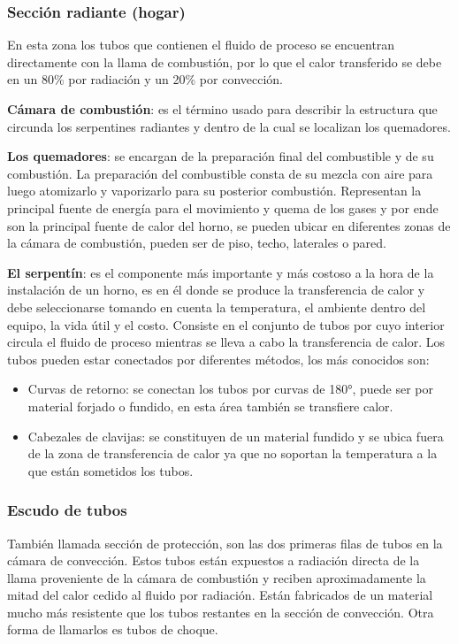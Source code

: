 \subsubsection{Sección radiante (hogar)}
\par En esta zona los tubos que contienen el fluido de proceso se encuentran directamente con la llama de combustión, por lo que el calor transferido se debe en un 80\% por radiación y un 20\% por convección. 
\par \textbf{Cámara de combustión}: es el término usado para describir la estructura que circunda los serpentines radiantes y dentro de la cual se localizan los quemadores.
\par \textbf{Los quemadores}: se encargan de la preparación final del combustible y de su combustión. La preparación del combustible consta de su mezcla con aire para luego atomizarlo y vaporizarlo para su posterior combustión. Representan la principal fuente de energía para el movimiento y quema de los gases y por ende son la principal fuente de calor del horno, se pueden ubicar en diferentes zonas de la cámara de combustión, pueden ser de piso, techo, laterales o pared.
\par \textbf{El serpentín}: es el componente más importante y más costoso a la hora de la instalación de un horno, es en él donde se produce la transferencia de calor y debe seleccionarse tomando en cuenta la temperatura, el ambiente dentro del equipo, la vida útil y el costo. Consiste en el conjunto de tubos por cuyo interior circula el fluido de proceso mientras se lleva a cabo la transferencia de calor. Los tubos pueden estar conectados por diferentes métodos, los más conocidos son:
\begin{itemize}
    \item Curvas de retorno: se conectan los tubos por curvas de 180°, puede ser por material forjado o fundido, en esta área también se transfiere calor.
    \item Cabezales de clavijas: se constituyen de un material fundido y se ubica fuera de la zona de transferencia de calor ya que no soportan la temperatura a la que están sometidos los tubos.
\end{itemize}


\subsubsection{Escudo de tubos}
\par También llamada sección de protección, son las dos primeras filas de tubos en la cámara de convección. Estos tubos están expuestos a radiación directa de la llama proveniente de la cámara de combustión y reciben aproximadamente la mitad del calor cedido al fluido por radiación. Están fabricados de un material mucho más resistente que los tubos restantes en la sección de convección. Otra forma de llamarlos es tubos de choque.

